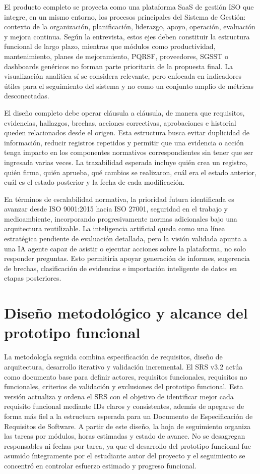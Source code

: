 \documentclass[final]{udpthesis}
\begin{document}
El producto completo se proyecta como una plataforma SaaS de gestión ISO que integre, en un mismo entorno, los procesos principales del Sistema de Gestión: contexto de la organización, planificación, liderazgo, apoyo, operación, evaluación y mejora continua. Según la entrevista, estos ejes deben constituir la estructura funcional de largo plazo, mientras que módulos como productividad, mantenimiento, planes de mejoramiento, PQRSF, proveedores, SGSST o dashboards genéricos no forman parte prioritaria de la propuesta final. La visualización analítica sí se considera relevante, pero enfocada en indicadores útiles para el seguimiento del sistema y no como un conjunto amplio de métricas desconectadas.

El diseño completo debe operar cláusula a cláusula, de manera que requisitos, evidencias, hallazgos, brechas, acciones correctivas, aprobaciones e historial queden relacionados desde el origen. Esta estructura busca evitar duplicidad de información, reducir registros repetidos y permitir que una evidencia o acción tenga impacto en los componentes normativos correspondientes sin tener que ser ingresada varias veces. La trazabilidad esperada incluye quién crea un registro, quién firma, quién aprueba, qué cambios se realizaron, cuál era el estado anterior, cuál es el estado posterior y la fecha de cada modificación.

En términos de escalabilidad normativa, la prioridad futura identificada es avanzar desde ISO 9001:2015 hacia ISO 27001, seguridad en el trabajo y medioambiente, incorporando progresivamente normas adicionales bajo una arquitectura reutilizable. La inteligencia artificial queda como una línea estratégica pendiente de evaluación detallada, pero la visión validada apunta a una IA agente capaz de asistir o ejecutar acciones sobre la plataforma, no solo responder preguntas. Esto permitiría apoyar generación de informes, sugerencia de brechas, clasificación de evidencias e importación inteligente de datos en etapas posteriores.

\chapter{Diseño metodológico y alcance del prototipo funcional}

La metodología seguida combina especificación de requisitos, diseño de arquitectura, desarrollo iterativo y validación incremental. El SRS v3.2 actúa como documento base para definir actores, requisitos funcionales, requisitos no funcionales, criterios de validación y exclusiones del prototipo funcional. Esta versión actualiza y ordena el SRS con el objetivo de identificar mejor cada requisito funcional mediante IDs claros y consistentes, además de apegarse de forma más fiel a la estructura esperada para un Documento de Especificación de Requisitos de Software. A partir de este diseño, la hoja de seguimiento organiza las tareas por módulos, horas estimadas y estado de avance. No se desagregan responsables ni fechas por tarea, ya que el desarrollo del prototipo funcional fue asumido íntegramente por el estudiante autor del proyecto y el seguimiento se concentró en controlar esfuerzo estimado y progreso funcional.
\end{document}
